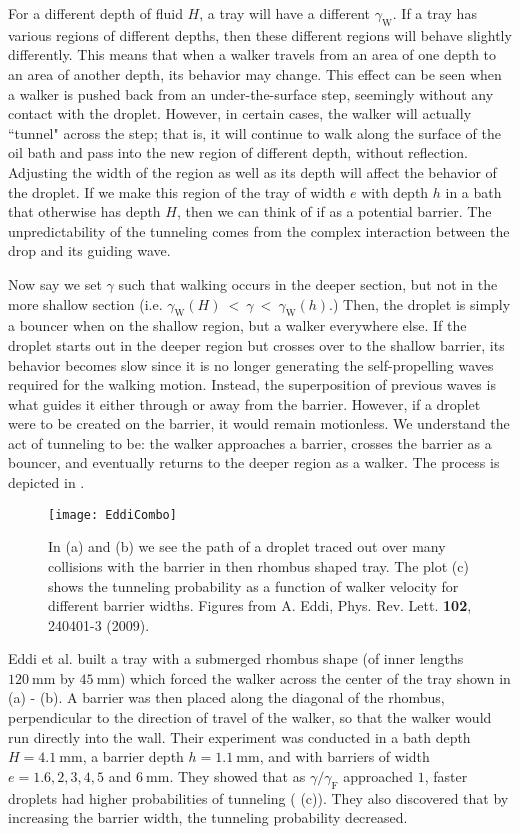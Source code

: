For a different depth of fluid $H$, a tray will have a different $\gamma_\mathrm{W}$. If a tray has various regions of different depths, then these different regions will behave slightly differently. This means that when a walker travels from an area of one depth to an area of another depth, its behavior may change. This effect can be seen when a walker is pushed back from an under-the-surface step, seemingly without any contact with the droplet. However, in certain cases, the walker will actually ``tunnel" across the step; that is, it will continue to walk along the surface of the oil bath and pass into the new region of different depth, without reflection. Adjusting the width of the region as well as its depth will affect the behavior of the droplet. If we make this region of the tray of width $e$ with depth $h$ in a bath that otherwise has depth $H$, then we can think of if as a potential barrier. The unpredictability of the tunneling comes from the complex interaction between the drop and its guiding wave. 

Now say we set $\gamma$ such that walking occurs in the deeper section, but not in the more shallow section (i.e.  $\gamma_\mathrm{W}(H)~<~\gamma~<~\gamma_\mathrm{W}(h)$.) Then, the droplet is simply a bouncer when on the shallow region, but a walker everywhere else. If the droplet starts out in the deeper region but crosses over to the shallow barrier, its behavior becomes slow since it is no longer generating the self-propelling waves required for the walking motion. Instead, the superposition of previous waves is what guides it either through or away from the barrier. However, if a droplet were to be created on the barrier, it would remain motionless. We understand the act of tunneling to be: the walker approaches a barrier, crosses the barrier as a bouncer, and eventually returns to the deeper region as a walker. The process is depicted in . 

\begin{figure}[]
  \texttt{[image: EddiCombo]}
\caption{In (a) and (b) we see the path of a droplet traced out over many collisions with the barrier in then rhombus shaped tray. The plot (c) shows the tunneling probability as a function of walker velocity for different barrier widths. Figures from A. Eddi, Phys. Rev. Lett. \textbf{102}, 240401-3 (2009).}
\label{fig:Eddi}
	\end{figure}

Eddi et al. built a tray with a submerged rhombus shape (of inner lengths $120~\mathrm{mm}$ by $45~\mathrm{mm}$) which forced the walker across the center of the tray shown in  (a) - (b). A barrier was then placed along the diagonal of the rhombus, perpendicular to the direction of travel of the walker, so that the walker would run directly into the wall. Their experiment was conducted in a bath depth $H = 4.1~\mathrm{mm}$, a barrier depth $h = 1.1~\mathrm{mm}$, and with barriers of width $e = 1.6, 2, 3, 4, 5 $ and $ 6~\mathrm{mm}$. They showed that as $\gamma/\gamma_\mathrm{F}$ approached $1$, faster droplets had higher probabilities of tunneling ( (c)). They also discovered that by increasing the barrier width, the tunneling probability decreased. 

